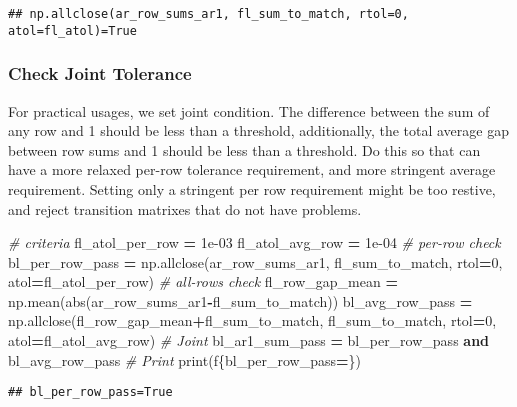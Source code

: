 \documentclass[
]{book}
\newenvironment{Shaded}{\begin{snugshade}}{\end{snugshade}}
\newcommand{\BuiltInTok}[1]{#1}
\newcommand{\CommentTok}[1]{\textcolor[rgb]{0.56,0.35,0.01}{\textit{#1}}}
\newcommand{\DecValTok}[1]{\textcolor[rgb]{0.00,0.00,0.81}{#1}}
\newcommand{\FloatTok}[1]{\textcolor[rgb]{0.00,0.00,0.81}{#1}}
\newcommand{\KeywordTok}[1]{\textcolor[rgb]{0.13,0.29,0.53}{\textbf{#1}}}
\newcommand{\NormalTok}[1]{#1}
\newcommand{\OperatorTok}[1]{\textcolor[rgb]{0.81,0.36,0.00}{\textbf{#1}}}
\newcommand{\SpecialCharTok}[1]{\textcolor[rgb]{0.00,0.00,0.00}{#1}}
\newcommand{\SpecialStringTok}[1]{\textcolor[rgb]{0.31,0.60,0.02}{#1}}
\begin{document}
\begin{verbatim}
## np.allclose(ar_row_sums_ar1, fl_sum_to_match, rtol=0, atol=fl_atol)=True
\end{verbatim}

\hypertarget{check-joint-tolerance}{%
\subsubsection{Check Joint Tolerance}\label{check-joint-tolerance}}

For practical usages, we set joint condition. The difference between the sum of any row and 1 should be less than a threshold, additionally, the total average gap between row sums and 1 should be less than a threshold. Do this so that can have a more relaxed per-row tolerance requirement, and more stringent average requirement. Setting only a stringent per row requirement might be too restive, and reject transition matrixes that do not have problems.

\begin{Shaded}
\begin{Highlighting}[]
\CommentTok{\# criteria}
\NormalTok{fl\_atol\_per\_row }\OperatorTok{=} \FloatTok{1e{-}03}
\NormalTok{fl\_atol\_avg\_row }\OperatorTok{=} \FloatTok{1e{-}04}
\CommentTok{\# per{-}row check}
\NormalTok{bl\_per\_row\_pass }\OperatorTok{=}\NormalTok{ np.allclose(ar\_row\_sums\_ar1, fl\_sum\_to\_match, rtol}\OperatorTok{=}\DecValTok{0}\NormalTok{, atol}\OperatorTok{=}\NormalTok{fl\_atol\_per\_row)}
\CommentTok{\# all{-}rows check}
\NormalTok{fl\_row\_gap\_mean }\OperatorTok{=}\NormalTok{ np.mean(}\BuiltInTok{abs}\NormalTok{(ar\_row\_sums\_ar1}\OperatorTok{{-}}\NormalTok{fl\_sum\_to\_match))}
\NormalTok{bl\_avg\_row\_pass }\OperatorTok{=}\NormalTok{ np.allclose(fl\_row\_gap\_mean}\OperatorTok{+}\NormalTok{fl\_sum\_to\_match, fl\_sum\_to\_match, rtol}\OperatorTok{=}\DecValTok{0}\NormalTok{, atol}\OperatorTok{=}\NormalTok{fl\_atol\_avg\_row)}
\CommentTok{\# Joint}
\NormalTok{bl\_ar1\_sum\_pass }\OperatorTok{=}\NormalTok{ bl\_per\_row\_pass }\KeywordTok{and}\NormalTok{ bl\_avg\_row\_pass}
\CommentTok{\# Print}
\BuiltInTok{print}\NormalTok{(}\SpecialStringTok{f\textquotesingle{}}\SpecialCharTok{\{}\NormalTok{bl\_per\_row\_pass}\OperatorTok{=}\SpecialCharTok{\}}\SpecialStringTok{\textquotesingle{}}\NormalTok{)}
\end{Highlighting}
\end{Shaded}

\begin{verbatim}
## bl_per_row_pass=True
\end{verbatim}
\end{document}
